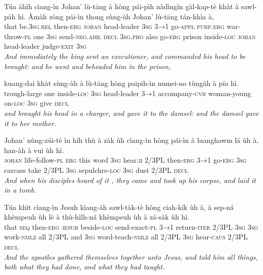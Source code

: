 \documentclass[11pt,a4paper]{article}
\begin{document}
\begin{exe}
\gll Túa àhìh cìang-ìn Johan' lù-tāng à hòng pái-pìh nàdìngìn gàl-kap-tè khàt à sawl-pàh hì. Àmàh zòng pái-ìn thong sùng-àh Johan' lù-tāng tán-khìa à, \\
     that be.\textsc{3sg}.\textsc{rel} then-\textsc{erg} \textsc{johan} head-leader \textsc{3sg} \textsc{3→1} go-\textsc{appl} \textsc{purp}.\textsc{erg} war-throw-\textsc{pl} one \textsc{3sg} send-\textsc{neg}.\textsc{abil} \textsc{decl} \textsc{3sg}.\textsc{pro} also go-\textsc{erg} prison inside-\textsc{loc} \textsc{johan} head-leader judge-\textsc{exit} \textsc{3sg} \\
\glt \textcolor{kjvcolor}{\textit{And immediately the king sent an executioner, and commanded his head to be brought: and he went and beheaded him in the prison,}}

\gll kuang-dai khàt sùng-àh à lù-tāng hòng paipih-ìn numei-no tùngàh à pía hì. \\
     trough-large one inside-\textsc{loc} \textsc{3sg} head-leader \textsc{3→1} accompany-\textsc{cvb} woman-young on-\textsc{loc} \textsc{3sg} give \textsc{decl} \\
\glt \textcolor{kjvcolor}{\textit{and brought his head in a charger, and gave it to the damsel: and the damsel gave it to her mother.}}

\gll Johan' nùng-zúi-tè ìn híh thù à zàk ùh cìang-ìn hòng pái-ìn à luanghawm lá ùh à, han-àh à vui ùh hì. \\
     \textsc{johan} life-follow-\textsc{pl} \textsc{erg} this word \textsc{3sg} hear.\textsc{ii} 2/3PL then-\textsc{erg} \textsc{3→1} go-\textsc{erg} \textsc{3sg} carcass take 2/3PL \textsc{3sg} sepulchre-\textsc{loc} \textsc{3sg} dust 2/3PL \textsc{decl} \\
\glt \textcolor{kjvcolor}{\textit{And when his disciples heard of it , they came and took up his corpse, and laid it in a tomb.}}

\gll Túa khìt cìang-ìn Jesuh kìang-àh sawl-tàk-tè hòng ciah-kík ùh à, à sep-ná khèmpeuh ùh lè à thù-hìlh-ná khèmpeuh ùh à zá-sàk ùh hì. \\
     that \textsc{seq} then-\textsc{erg} \textsc{jesuh} beside-\textsc{loc} send-exact-\textsc{pl} \textsc{3→1} return-\textsc{iter} 2/3PL \textsc{3sg} \textsc{3sg} work-\textsc{nmlz} all 2/3PL and \textsc{3sg} word-teach-\textsc{nmlz} all 2/3PL \textsc{3sg} hear-\textsc{caus} 2/3PL \textsc{decl} \\
\glt \textcolor{kjvcolor}{\textit{And the apostles gathered themselves together unto Jesus, and told him all things, both what they had done, and what they had taught.}}


\end{exe}
\end{document}
